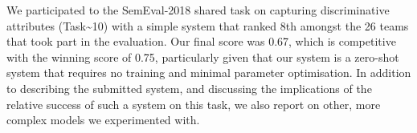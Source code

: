 We participated to the SemEval-2018 shared task on capturing discriminative attributes (Task{\textasciitilde}10) with a simple system that ranked 8th amongst the 26 teams that took part in the evaluation. Our final score was 0.67, which is competitive with the winning score of 0.75, particularly given that our system is a zero-shot system that requires no training and minimal parameter optimisation. In addition to describing the submitted system, and discussing the implications of the relative success of such a system on this task, we also report on other, more complex models we experimented with.
